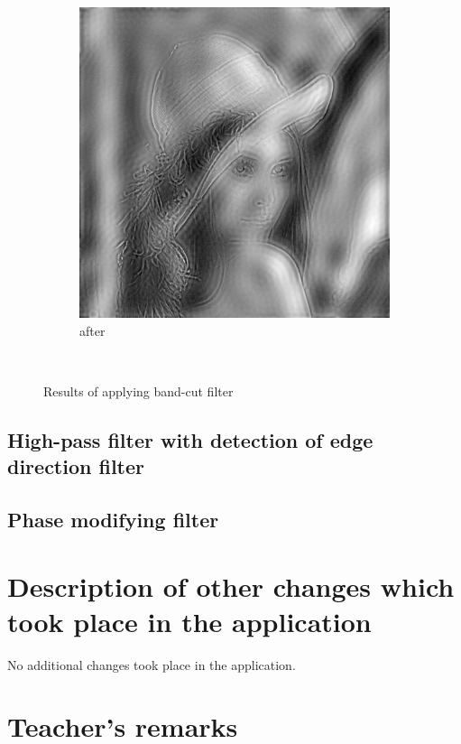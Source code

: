 \documentclass[12pt]{article}
\begin{document}
\begin{figure}[H]
\begin{subfigure}[t]{\subfiguresize}
        \includegraphics[width=\textwidth]{img/lena_bandcut.png}
        \caption{after}
    \end{subfigure}\\[1em]
    \caption{Results of applying band-cut filter}
\end{figure}  
\subsection{High-pass filter with detection of edge direction filter}
\subsection{Phase modifying filter}
 
\section{Description of other changes which took place in the application}

No additional changes took place in the application.

\vfill
\section*{Teacher's remarks}
\begin{tabularx}{\textwidth}{|X|}
    \hline
    \vspace{7cm}
    \phantom{.} \\
    \hline
\end{tabularx}
\end{document}

